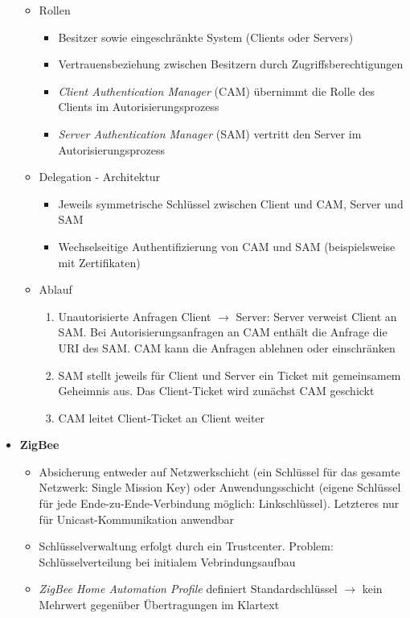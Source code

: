 \begin{itemize}
\begin{itemize}
		\item Rollen
		\begin{itemize}
			\item Besitzer sowie eingeschränkte System (Clients oder Servers)
			\item Vertrauensbeziehung zwischen Besitzern durch Zugriffsberechtigungen
			\item \textit{Client Authentication Manager} (CAM) übernimmt die Rolle des Clients im Autorisierungsprozess
			\item \textit{Server Authentication Manager} (SAM) vertritt den Server im Autorisierungsprozess
		\end{itemize}
		\item Delegation - Architektur
		\begin{itemize}
			\item Jeweils symmetrische Schlüssel zwischen Client und CAM, Server und SAM
			\item Wechselseitige Authentifizierung von CAM und SAM (beispielsweise mit Zertifikaten)
		\end{itemize}
		\item Ablauf
		\begin{enumerate}
			\item Unautorisierte Anfragen Client \(\rightarrow\) Server: Server verweist Client an SAM. Bei Autorisierungsanfragen an CAM enthält die Anfrage die URI des SAM. CAM kann die Anfragen ablehnen oder einschränken
			\item SAM stellt jeweils für Client und Server ein Ticket mit gemeinsamem Geheimnis aus. Das Client-Ticket wird zunächst CAM geschickt
			\item CAM leitet Client-Ticket an Client weiter
		\end{enumerate}
	\end{itemize}
	\item \textbf{ZigBee}
	\begin{itemize}
		\item Absicherung entweder auf Netzwerkschicht (ein Schlüssel für das gesamte Netzwerk: Single Mission Key) oder Anwendungsschicht (eigene Schlüssel für jede Ende-zu-Ende-Verbindung möglich: Linkschlüssel). Letzteres nur für Unicast-Kommunikation anwendbar
		\item Schlüsselverwaltung erfolgt durch ein Trustcenter. Problem: Schlüsselverteilung bei initialem Vebrindungsaufbau
		\item \textit{ZigBee Home Automation Profile} definiert Standardschlüssel \(\rightarrow\) kein Mehrwert gegenüber Übertragungen im Klartext
	\end{itemize}
\end{itemize}


